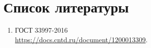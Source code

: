 \documentclass[./nirs.tex]{subfiles}
\begin{document}
\section*{Список литературы}
\begin{enumerate}
	\item ГОСТ 33997-2016 \\
	\url{https://docs.cntd.ru/document/1200013309}.


\end{enumerate}
\end{document}
